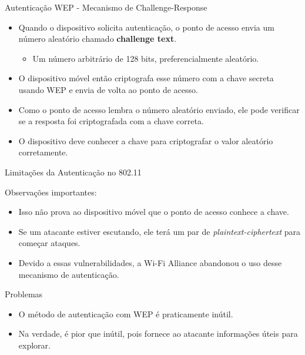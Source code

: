 \begin{frame}{Autenticação WEP - Mecanismo de Challenge-Response}



    \begin{itemize}
        \item Quando o dispositivo solicita autenticação, o ponto de acesso envia um número aleatório chamado \textbf{challenge text}.
              \begin{itemize}
                  \item Um número arbitrário de 128 bits, preferencialmente aleatório.
              \end{itemize}
    \end{itemize}



    \begin{itemize}
        \item O dispositivo móvel então criptografa esse número com a chave secreta usando WEP e envia de volta ao ponto de acesso.
        \item Como o ponto de acesso lembra o número aleatório enviado, ele pode verificar se a resposta foi criptografada com a chave correta.
        \item O dispositivo deve conhecer a chave para criptografar o valor aleatório corretamente.
    \end{itemize}



\end{frame}


\begin{frame}{Limitações da Autenticação no 802.11}

    \begin{block}{Observações importantes:}
        \begin{itemize}
            \item Isso não prova ao dispositivo móvel que o ponto de acesso conhece a chave.
            \item Se um atacante estiver escutando, ele terá um par de \textit{plaintext-ciphertext} para começar ataques.
            \item Devido a essas vulnerabilidades, a Wi-Fi Alliance abandonou o uso desse mecanismo de autenticação.
        \end{itemize}
    \end{block}

    \begin{block}{Problemas}
        \begin{itemize}
            \item O método de autenticação com WEP é praticamente inútil.
            \item Na verdade, é pior que inútil, pois fornece ao atacante informações úteis para explorar.
        \end{itemize}
    \end{block}


\end{frame}


